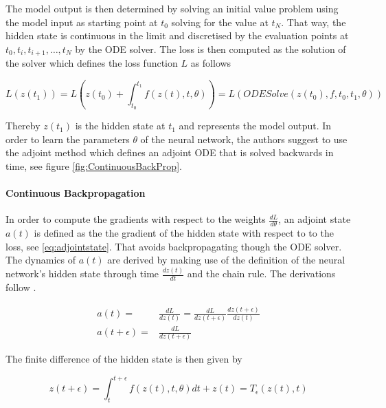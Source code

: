 \documentclass[10pt]{reportMaster}
\begin{document}
The model output is then determined by solving an initial value problem using the model input as starting point at $t_{0}$ solving for the value at $t_{N}$. That way, the hidden state is continuous in the limit and discretised by the evaluation points at $t_{0}, t_{i}, t_{i+1}, \ldots, t_{N} $  by the ODE solver. The loss is then computed as the solution of the solver which defines the loss function $L$ as follows 

\begin{equation}
\label{eq:loss function}
L(z(t_{1})) = L(z(t_{0}) + \int_{t_{0}}^{t_{1}}f(z(t), t, \theta)) = L(ODESolve(z(t_{0}), f, t_{0}, t_{1}, \theta))
\end{equation}
 
Thereby $z(t_{1})$ is the hidden state at $t_{1}$ and represents the model output. In order to learn the parameters $\theta$ of the neural network, the authors suggest to use the adjoint method \cite{pontryagin1987mathematical} which defines an adjoint ODE that is solved backwards in time, see figure \ref{fig:ContinuousBackProp}.

\paragraph{Continuous Backpropagation}

In order to compute the gradients with respect to the weights $\frac{dL}{d\theta}$, an adjoint state $a(t)$ is defined as the the gradient of the hidden state with respect to to the loss, see \ref{eq:adjointstate}.  That avoids backpropagating though the ODE solver. The dynamics of $a(t)$ are derived by making use of the definition of the neural network's hidden state  through time $\frac{dz(t)}{dt}$ and the chain rule. The derivations follow \cite[Appendix B.1]{chen2018neural}. 

\begin{align}
a(t) = & \frac{d L}{d z(t)} = \frac{d L}{d z(t + \epsilon)} \frac{d z(t + \epsilon)}{dz(t)}  \label{eq:adjointstate} \\
a(t +\epsilon) = & \frac{d L}{d z(t + \epsilon)}   \label{eq:adjointstateepsilon}
\end{align}

The finite difference of the hidden state is then given by

 \begin{equation}
\label{eq:hiddenstatedynamicsespsilon}
z(t + \epsilon) =  \int_{t}^{t + \epsilon} f(z(t), t, \theta)dt + z(t) = T_{\epsilon}(z(t), t)
\end{equation}
\end{document}

